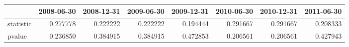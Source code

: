 \begin{tabular}{lrrrrrrr}
\toprule
{} &  2008-06-30 &  2008-12-31 &  2009-06-30 &  2009-12-31 &  2010-06-30 &  2010-12-31 &  2011-06-30 \\
\midrule
statistic &    0.277778 &    0.222222 &    0.222222 &    0.194444 &    0.291667 &    0.291667 &    0.208333 \\
pvalue    &    0.236850 &    0.384915 &    0.384915 &    0.472853 &    0.206561 &    0.206561 &    0.427943 \\
\bottomrule
\end{tabular}
